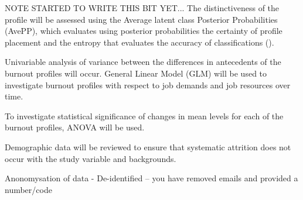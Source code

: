 \documentclass[man]{apa7}
\begin{document}
NOTE STARTED TO WRITE THIS BIT YET...
The distinctiveness of the profile will be assessed using the Average latent class Posterior Probabilities (AvePP), which evaluates using posterior probabilities the certainty of profile placement and the entropy that evaluates the accuracy of classifications (\cite{Jung2008AnModeling}).

Univariable analysis of variance between the differences in antecedents of the burnout profiles will occur. General Linear Model (GLM) will be used to investigate burnout profiles with respect to job demands and job resources over time. 

To investigate statistical significance of changes in mean levels for each of the burnout profiles, ANOVA will be used. 

Demographic data will be reviewed to ensure that systematic attrition does not occur with the study variable and backgrounds. 

Anonomysation of data - De-identified – you have removed emails and provided a number/code

\printbibliography
\end{document}
